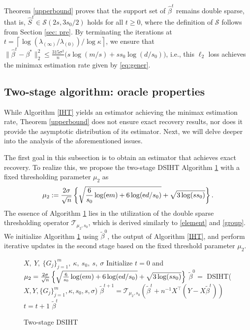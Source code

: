 \documentclass[12pt]{article}
\begin{document}
Theorem \ref{upperbound} proves that the support set of $\hat{\beta}^t$ remains double sparse, that is, $\hat{S}^t \in \mathcal{S} (2s,3s_0/2)$ holds for all $t \ge 0$, where the definition of $\mathcal{S}$ follows from Section \ref{sec: pre}. 
By terminating the iterations at $t = \left \lceil \log ( \lambda_{(\infty)} / \lambda_{(0)} )/ {\log \kappa} \right \rceil $, we ensure that $\|\hat{\beta}^{t} - \beta^* \|_2^2 \le \frac{315\sigma^2}n \big( s \log({m}/{s}) + ss_0 \log(d/s_0) \big)$, i.e., this $\ell_2$ loss achieves the minimax estimation rate given by \eqref{eq:gener}. 


\subsection{Two-stage algorithm: oracle properties}\label{3.2}
While Algorithm \ref{IHT} yields an estimator achieving the minimax estimation rate, Theorem \ref{upperbound} does not ensure exact recovery results, nor does it provide the asymptotic distribution of its estimator.
Next, we will delve deeper into the analysis of the aforementioned issues.

The first goal in this subsection is to obtain an estimator that achieves exact recovery.
To realize this, we propose the two-stage DSIHT Algorithm \ref{scaledIHT} with a fixed thresholding parameter $\mu_2$ as
\begin{equation}
\mu_2 := \frac{2\sigma}{\sqrt n}  \left\{  \sqrt{ \frac6{s_0} \log ({\rm e} m ) +  6\log({{\rm e} d}/{s_0})  }+ \sqrt{ 3 \log(ss_0)  } \right\}.
\end{equation}
The essence of Algorithm \ref{scaledIHT} lies in the utilization of the double sparse thresholding operator $\mathcal T_{\mu_2,s_0}$, which is derived similarly to \eqref{element} and \eqref{group}.
We initialize Algorithm \ref{scaledIHT} using $\tilde \beta^0$,  the output of Algorithm \ref{IHT}, and perform iterative updates in the second stage based on the fixed threshold parameter $\mu_2$.

\begin{figure}
\begin{algorithm}[H]
\caption{Two-stage DSIHT}\label{scaledIHT}  %
\begin{algorithmic}[1]
    \REQUIRE  $X,\ Y,\ \{G_j\}^m_{j=1},\ \kappa, \ s_0,\ s,\ \sigma$
    \STATE Initialize $t=0$ and $\mu_2 = \frac{2\sigma}{\sqrt n}  \left\{  \sqrt{ \frac6{s_0} \log ({\rm e} m ) +  6\log({{\rm e} d}/{s_0})  }+ \sqrt{ 3 \log(ss_0)  } \right\}$
    \STATE  $\tilde \beta^0 =$ DSIHT($X, Y, \{G_j\}^m_{j=1}, \kappa, s_0, s, \sigma$) 
    \STATE ${\tilde \beta}^{t+1} = \mathcal{T}_{\mu_{2}, s_0}\left({\tilde \beta}^{t} + n^{-1} X^\top(Y-X{\tilde \beta}^{t})\right)$
    \STATE $t = t+1$
    \ENDWHILE
    \ENSURE $\tilde \beta^{t}$ 
  \end{algorithmic}
\end{algorithm}
\end{figure}
\end{document}
